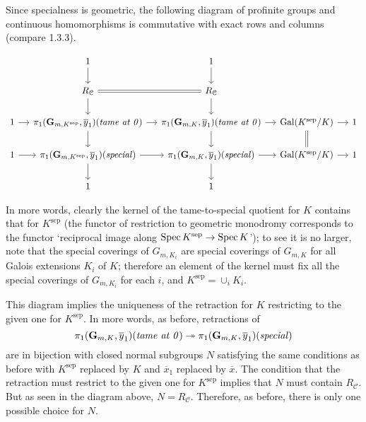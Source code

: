 \documentclass[deligne.tex]{subfiles}
\begin{document}
Since specialness is geometric, the following diagram of profinite groups
and continuous homomorphisms is commutative with exact rows and columns 
(compare 1.3.3).
\begin{ceqn}\begin{equation*}\begin{tikzcd}[column sep=small]
	&1\arrow[d]& 1\arrow[d] \\
	&R_{\mathcal C}\arrow[r,equals]\arrow[d]
	&R_{\mathcal C}\arrow[d] \\
	1\arrow[r]&\pi_1(\GG_{m,K^{\mathrm{sep}}},\overline y_1)(\text{\emph{tame at 0}})\arrow[r]\arrow[d]
	&\pi_1(\GG_{m,K},\overline y_1)(\text{\emph{tame at 0}})\arrow[r]\arrow[d]&\Gal(K^{\mathrm{sep}}/K)\arrow[d,equals]\arrow[r]&1 \\
	1\arrow[r]&\pi_1(\GG_{m,K^{\mathrm{sep}}},\overline y_1)(\text{\emph{special}})\arrow[r]\arrow[d]
	&\pi_1(\GG_{m,K},\overline y_1)(\text{\emph{special}})\arrow[r]\arrow[d]
	&\Gal(K^{\mathrm{sep}}/K)\arrow[r]&1 \\
	&1&1
\end{tikzcd}\end{equation*}\end{ceqn}
In more words, clearly the kernel of the tame-to-special quotient for $K$
contains that for $K^{\mathrm{sep}}$ (the functor of restriction to 
geometric monodromy corresponds to the functor `reciprocal image along
$\operatorname{Spec} K^{\mathrm{sep}}\rightarrow\operatorname{Spec} K$'); to see it is no larger, note that
the special coverings of $G_{m,K_i}$ are special coverings of $G_{m,K}$ for
all Galois extensions $K_i$ of $K$; therefore an element of the kernel must
fix all the special coverings of $G_{m,K_i}$ for each $i$, and
$K^{\mathrm{sep}}=\cup_i K_i$.

This diagram implies the uniqueness of the retraction for $K$ restricting
to the given one for $K^{\mathrm{sep}}$.
In more words, as before, retractions of
\begin{equation*}
	\pi_1(\mathbf{G}_{m,K},\overline y_1)(\text{\emph{tame at 0}})
	\twoheadrightarrow
	\pi_1(\mathbf{G}_{m,K},\overline y_1)(\text{\emph{special}})
\end{equation*}
are in bijection with closed normal subgroups $N$ satisfying the same
conditions as before with $K^{\mathrm{sep}}$ replaced by $K$ and
$\overline x_1$ replaced by $\overline x$. The condition that the 
retraction must restrict to the given one for $K^{\mathrm{sep}}$ implies
that $N$ must contain $R_{\mathcal C}$. But as seen in the diagram above,
$N=R_{\mathcal C}$. Therefore, as before, there is only one possible choice
for $N$.
\end{document}
